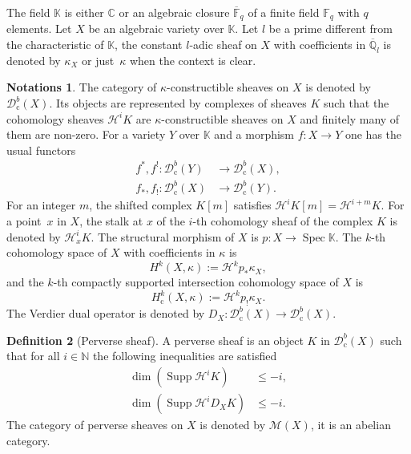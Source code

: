 \documentclass[11pt]{article}
\newcommand{\rc}{\mathrm{c}}
\theoremstyle{definition}
\newtheorem{definition}{Definition}[section]
\newtheorem{notations}[definition]{Notations}
\theoremstyle{plain}
\DeclareMathOperator{\Spec}{Spec}
\DeclareMathOperator{\supp}{Supp}
\newcommand\KK{\mathbb K }
\newcommand{\C}{\mathbb{C}}
\newcommand{\qlbar}{\overline{\mathbb{Q}}_l}
\newcommand{\Fq}{\mathbb{F}_q}
\newcommand{\Fqbar}{\overline{\mathbb{F}}_q}
\newcommand{\NN}{\mathbb N}
\newcommand{\dcb}[1]{\mathcal{D}_\rc^b(#1)}
\newcommand{\hi}{\mathcal H ^i}
\begin{document}
The field $\KK$ is either $\C$ or an algebraic closure $\Fqbar$ of a finite field $\Fq$ with $q$ elements. Let $X$ be an algebraic variety over $\KK$. Let $l$ be a prime different from the characteristic of $\KK$, the constant $l$-adic sheaf on $X$ with coefficients in $\qlbar$ is denoted by $\kappa_X$ or just~$\kappa$ when the context is clear.

\begin{notations}
The category of $\kappa$-constructible sheaves on $X$ is denoted by $\dcb{X}$. Its objects are represented by complexes of sheaves $K$ such that the cohomology sheaves $\mathcal H ^i K$ are $\kappa$-constructible sheaves on $X$ and finitely many of them are non-zero. For a variety $Y$ over $\KK$ and a morphism $f:X\to Y$ one has the usual functors
\begin{align*}
f^*, f^! : \dcb Y &\to \dcb X,\\
f_*, f_! : \dcb X &\to \dcb Y.
\end{align*}
For an integer $m$, the shifted complex $K[m]$ satisfies $\hi K[m] = \mathcal{H}^{i+m}K$. For a point~$x$ in $X$, the stalk at $x$ of the $i$-th cohomology sheaf of the complex $K$ is denoted by $\hi_x K $. The structural morphism of $X$ is $p:X\to\Spec\KK$. The $k$-th cohomology space of $X$ with coefficients in $\kappa$ is
\[
H^k(X,\kappa) := \mathcal{H}^k p_* \kappa_X,
\]
and the $k$-th compactly supported intersection cohomology space of $X$ is
\[
H^k_\rc (X,\kappa) := \mathcal{H}^k p_! \kappa_X.
\]
The Verdier dual operator is denoted by $D_X:\dcb X \to \dcb X$.
\end{notations}

\begin{definition}[Perverse sheaf]
A perverse sheaf is an object $K$ in $\dcb X$ such that for all $i\in\NN$ the following inequalities are satisfied
\begin{align*}
\dim \left(\supp \hi K\right) &\le -i, \\
\dim \left(\supp \hi D_X K\right) &\le -i.
\end{align*}
The category of perverse sheaves on $X$ is denoted by $\mathcal{M}(X)$, it is an abelian category.
\end{definition}
\end{document}
